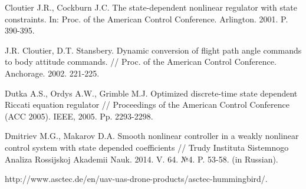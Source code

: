\documentclass[review]{elsarticle}
\begin{document}
\begin{thebibliography}{9}
	 Cloutier J.R., Cockburn J.C. The state-dependent nonlinear regulator with state constraints. In: Proc. of the American Control Conference. Arlington. 2001. P. 390-395.
	
	 J.R. Cloutier, D.T. Stansbery. Dynamic conversion of flight path angle commands to body attitude commands. // Proc. of the American Control Conference. Anchorage. 2002. 221-225.
	
	 Dutka A.S., Ordys A.W., Grimble M.J. Optimized discrete-time state dependent Riccati equation regulator // Proceedings of the American Control Conference (ACC 2005). IEEE, 2005. Pp. 2293-2298.
		
	 Dmitriev M.G., Makarov D.A. Smooth nonlinear controller in a weakly nonlinear control system with state depended coefficients // Trudy Instituta Sistemnogo Analiza Rossijskoj Akademii Nauk. 2014. V. 64. №4. P. 53-58. (in Russian).
	
	 http://www.asctec.de/en/uav-uas-drone-products/asctec-hummingbird/.
	
\end{thebibliography}
\end{document}
